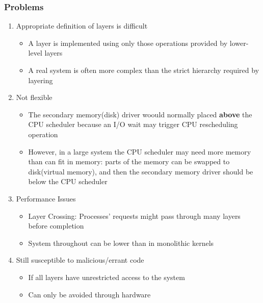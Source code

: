 \documentclass[11pt]{article}
\theoremstyle{definition}
\begin{document}
        \subsubsection{Problems}
            \begin{enumerate}
                \item Appropriate definition of layers is difficult
                    \begin{itemize}
                        \item A layer is implemented using only those operations provided by lower-level layers
                        \item A real system is often more complex than the strict hierarchy required by layering
                    \end{itemize}
                \item Not flexible
                    \begin{itemize}
                        \item The secondary memory(disk) driver woould normally placed \textbf{above} the CPU scheduler because an I/O wait may trigger CPU rescheduling operation
                        \item However, in a large system the CPU scheduler may need more memory than can fit in memory: parts of the memory can be swapped to disk(virtual memory), and then the secondary memory driver should be below the CPU scheduler
                    \end{itemize}
                \item Performance Issues
                    \begin{itemize}
                        \item Layer Crossing: Processes' requests might pass through many layers before completion
                        \item System throughout can be lower than in monolithic kernels
                    \end{itemize}
                \item Still susceptible to malicious/errant code
                    \begin{itemize}
                        \item If all layers have unrestricted access to the system
                        \item Can only be avoided through hardware
                    \end{itemize}
            \end{enumerate}
\end{document}
